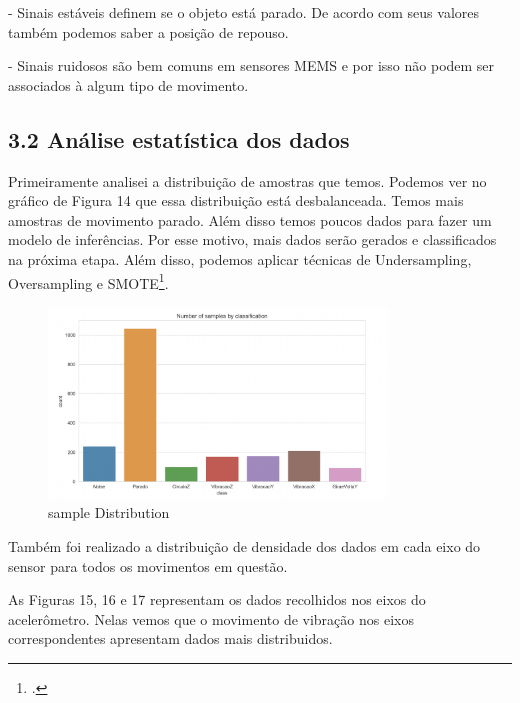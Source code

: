 - Sinais estáveis definem se o objeto está parado. De acordo com seus valores também podemos saber a posição de repouso.

- Sinais ruidosos são bem comuns em sensores MEMS e por isso não podem ser associados à algum tipo de movimento.




\subsection*{3.2 Análise estatística dos dados}

Primeiramente analisei a distribuição de amostras que temos.
Podemos ver no gráfico de Figura 14 que essa distribuição está desbalanceada.
Temos mais amostras de movimento parado. Além disso temos poucos dados para fazer
um modelo de inferências. Por esse motivo, mais dados serão gerados e classificados na próxima etapa.
Além disso, podemos aplicar técnicas de Undersampling, Oversampling e SMOTE\footcite[]{SMOTE: Synthetic Minority Oversampling Technique}.

\begin{figure}[H]
    \center
    \includegraphics[width=9cm]{images/sampleDistribution.png}
    \caption{ sample Distribution }
\end{figure}

Também foi realizado a distribuição de densidade dos dados em cada eixo do sensor 
para todos os movimentos em questão.

As Figuras 15, 16 e 17 representam os dados recolhidos nos eixos do acelerômetro.
Nelas vemos que o movimento de vibração nos eixos correspondentes apresentam dados mais distribuidos.


